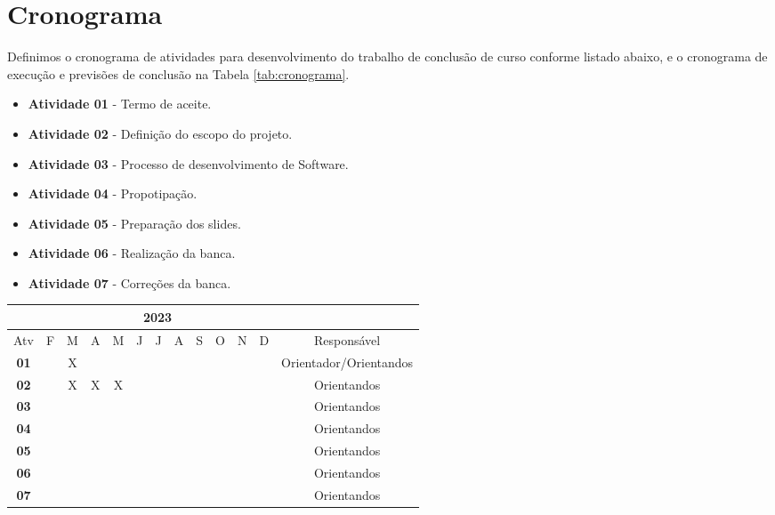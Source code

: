 \section{Cronograma}


Definimos o cronograma de atividades para desenvolvimento do trabalho de conclusão de curso conforme listado abaixo, e o cronograma de execução e previsões de conclusão na Tabela \ref{tab:cronograma}.

\begin{itemize}
    \item \textbf{Atividade 01} - Termo de aceite.
    \item \textbf{Atividade 02} - Definição do escopo do projeto.
    \item \textbf{Atividade 03} - Processo de desenvolvimento de Software.
    \item \textbf{Atividade 04} - Propotipação.
    \item \textbf{Atividade 05} - Preparação dos slides.
    \item \textbf{Atividade 06} - Realização da banca.
    \item \textbf{Atividade 07} - Correções da banca.
\end{itemize}

\begin{table*}[ht]
\centering
\caption{Cronograma das atividades}
\label{tab:cronograma}
\begin{tabular}{|c|c|c|c|c|c|c|c|c|c|c|c|c|}
\hline & \multicolumn{11}{|c|}{2023} & \multicolumn{1}{|c|}{} \\
\hline \multicolumn{1}{|c|}{Atv} & F & M & A & M & J & J & A & S & O & N & D & {Responsável} \\
\hline \textbf{01} & & X& & & & & & & & & & Orientador/Orientandos \\
\hline \textbf{02} & & X& X& X& & & & & & & & Orientandos \\
\hline \textbf{03} & & & & & & & & & & & & Orientandos\\
\hline \textbf{04} & & & & & & & & & & & & Orientandos\\
\hline \textbf{05} & & & & & & & & & & & & Orientandos\\
\hline \textbf{06} & & & & & & & & & & & & Orientandos\\
\hline \textbf{07} & & & & & & & & & & & & Orientandos\\
\hline
\end{tabular} 
\end{table*}


